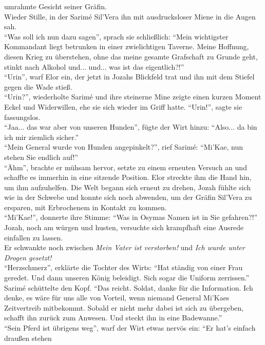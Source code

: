 umrahmte Gesicht seiner Gräfin.\\
Wieder Stille, in der Sarimé Sil'Vera ihn mit ausdrucksloser Miene in die Augen sah.\\
``Was soll ich nun dazu sagen'', sprach sie schließlich: ``Mein wichtigster Kommandant liegt 
betrunken in einer zwielichtigen Taverne. Meine Hoffnung, diesen Krieg zu überstehen, ohne das 
meine gesamte Grafschaft zu Grunde geht, stinkt nach Alkohol und... und... was ist das 
eigentlich?!''\\
``Urin'', warf Elor ein, der jetzt in Jozahs Blickfeld trat und ihn mit dem Stiefel gegen die Wade 
stieß.\\
``Urin?'', wiederholte Sarimé und ihre steinerne Mine zeigte einen kurzen Moment Eckel und 
Widerwillen, ehe sie sich wieder im Griff hatte. ``Urin!'', sagte sie fassungslos.\\
``Jaa... das war aber von unseren Hunden'', fügte der Wirt hinzu: ``Also... da bin ich mir ziemlich
sicher.''\\
``Mein General wurde von Hunden angepinkelt?'', rief Sarimé: ``Mi'Kae, nun stehen Sie endlich 
auf!''\\
``Ähm'', brachte er mühsam hervor, setzte zu einem erneuten Versuch an und schaffte es immerhin in 
eine sitzende Position. Elor streckte ihm die Hand hin, um ihm aufzuhelfen. Die Welt begann sich 
erneut zu drehen, Jozah fühlte sich wie in der Schwebe und konnte sich noch abwenden, um der Gräfin 
Sil'Vera zu ersparen, mit Erbrochenem in Kontakt zu kommen.\\
``Mi'Kae!'', donnerte ihre Stimme: ``Was in Osymas Namen ist in Sie gefahren?!''\\
Jozah, noch am würgen und husten, versuchte sich krampfhaft eine Ausrede einfallen zu lassen.\\
Er schwankte noch zwischen \textit{Mein Vater ist verstorben!} und \textit{Ich wurde unter Drogen 
gesetzt!}\\
``Herzschmerz'', erklärte die Tochter des Wirts: ``Hat ständig von einer Frau geredet. Und dann 
unseren König beleidigt. Sich sogar die Uniform zerrissen.''\\
Sarimé schüttelte den Kopf. ``Das reicht. Soldat, danke für die Information. Ich denke, es wäre für 
uns alle von Vorteil, wenn niemand General Mi'Kaes Zeitvertreib mitbekommt. Sobald er nicht mehr 
dabei ist sich zu übergeben, schafft ihn zurück zum Anwesen. Und steckt ihn in eine Badewanne.''\\
``Sein Pferd ist übrigens weg'', warf der Wirt etwas nervös ein: ``Er hat's einfach draußen stehen 
